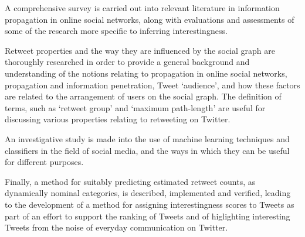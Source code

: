 A comprehensive survey is carried out into relevant literature in information propagation in online social networks, along with evaluations and assessments of some of the research more specific to inferring interestingness.

Retweet properties and the way they are influenced by the social graph are thoroughly researched in order to provide a general background and understanding of the notions relating to propagation in online social networks, propagation and information penetration, Tweet `audience', and how these factors are related to the arrangement of users on the social graph. The definition of terms, such as `retweet group' and `maximum path-length' are useful for discussing various properties relating to retweeting on Twitter.

An investigative study is made into the use of machine learning techniques and classifiers in the field of social media, and the ways in which they can be useful for different purposes.

Finally, a method for suitably predicting estimated retweet counts, as dynamically nominal categories, is described, implemented and verified, leading to the development of a method for assigning interestingness scores to Tweets as part of an effort to support the ranking of Tweets and of higlighting interesting Tweets from the noise of everyday communication on Twitter.
